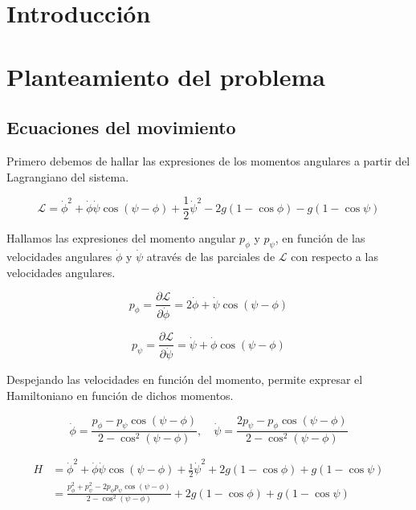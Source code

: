 \documentclass[11pt, twoside]{article} %
\begin{document}
\newpage

\setcounter{page}{0}
\tableofcontents
\newpage

\pagestyle{main}

\section{Introducción}

\section{Planteamiento del problema}
\subsection{Ecuaciones del movimiento}
Primero debemos de hallar las expresiones de los momentos angulares
a partir del Lagrangiano del sistema. 

\begin{equation}
    \mathcal{L} = \dot{\phi}^2 + \dot{\phi}\dot{\psi} \cos(\psi - \phi) +
     \frac{1}{2}\dot{\psi}^2 - 2g(1-\cos\phi) - g(1-\cos\psi) 
\end{equation}

Hallamos las expresiones del momento angular $p_\phi$ y $p_\psi$, en función
de las velocidades angulares $\dot{\phi}$ y $\dot{\psi}$ através de las 
parciales de $\mathcal{L}$ con respecto a las velocidades angulares.

\begin{equation}
    p_\phi = \frac{\partial \mathcal{L}}{\partial \dot{\phi}} = 2\dot{\phi} + \dot{\psi}\cos(\psi - \phi)
\end{equation}

\begin{equation}
    p_\psi = \frac{\partial \mathcal{L}}{\partial \dot{\psi}} = \dot{\psi} + \dot{\phi}\cos(\psi - \phi)
\end{equation}

Despejando las velocidades en función del momento, permite expresar el 
Hamiltoniano en función de dichos momentos.

\begin{equation}
    \dot{\phi} = \frac{p_\phi - p_\psi\cos(\psi - \phi)}{2-\cos^2(\psi - \phi)}, \quad 
    \dot{\psi} = \frac{2p_\psi - p_\phi\cos(\psi - \phi)}{2-\cos^2(\psi - \phi)}
\end{equation}

\begin{equation}
    \begin{split}
        H &= \dot{\phi}^2 + \dot{\phi}\dot{\psi} \cos(\psi - \phi) +
\frac{1}{2}\dot{\psi}^2 + 2g(1-\cos\phi) + g(1-\cos\psi)  \\
 &=\frac{p_\phi^2 + p_\psi^2 - 2p_\phi p_\psi \cos(\psi - \phi)}{2-\cos^2(\psi - \phi)} + 2g(1-\cos\phi) + g(1-\cos\psi)
    \end{split}
\end{equation}
\end{document}
